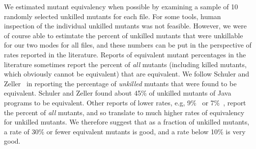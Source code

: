 \documentclass[sigconf,review, anonymous]{acmart}
\begin{document}
{We estimated mutant equivalency when possible by examining a sample of
10 randomly selected unkilled mutants for each file.  For some tools,
human inspection of the individual unkilled mutants was not feasible.
However, we were of course able to estimtate the percent of unkilled
mutants that were unkillable for our two modes for all files, and
these numbers can be put in the perspective of rates reported in the
literature.  Reports of equivalent mutant percentages in the
literature sometimes report the percent of \emph{all} mutants
(including killed mutants, which obviously cannot be equivalent) that
are equivalent.  We follow Schuler and Zeller~\cite{EquivMut} in
reporting the percentage of \emph{unkilled} mutants that were found to
be equivalent.  Schuler and Zeller found about 45\% of unkilled
mutants of Java programs to be equivalent.  Other reports of lower
rates, e.g, 9\%~\cite{offutt1997automatically} or 7\%~\cite{TCE}, report the percent of
\emph{all} mutants, and so translate to much higher rates of
equivalency for unkilled mutants.  We therefore suggest that as a
fraction of unkilled mutants, a rate of 30\% or fewer equivalent
mutants is good, and a rate below 10\% is very good.


\begin{table}[htbp]
\centering
\caption{C++ (Our Implementation vs. Dextool)}
\label{tab:table_cpp2}
\end{table}}
\end{document}
